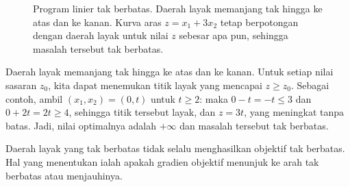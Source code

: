 \begin{solution}
\begin{figure}[H]
\caption{Program linier tak berbatas. Daerah layak memanjang tak hingga ke atas dan ke kanan. Kurva aras $z = x_1 + 3x_2$ tetap berpotongan dengan daerah layak untuk nilai $z$ sebesar apa pun, sehingga masalah tersebut tak berbatas.}
\label{fig:LPUnboundFeasibleRegion1}
\end{figure}

Daerah layak memanjang tak hingga ke atas dan ke kanan. Untuk setiap nilai sasaran $z_0$, kita dapat menemukan titik layak yang mencapai $z \geq z_0$. Sebagai contoh, ambil $(x_1,x_2) = (0,t)$ untuk $t\geq 2$: maka $0-t = -t \leq 3$ dan $0+2t = 2t\geq 4$, sehingga titik tersebut layak, dan $z = 3t$, yang meningkat tanpa batas. Jadi, nilai optimalnya adalah $+\infty$ dan masalah tersebut tak berbatas.
\end{solution}

Daerah layak yang tak berbatas tidak selalu menghasilkan objektif tak berbatas. Hal yang menentukan ialah apakah gradien objektif menunjuk ke arah tak berbatas atau menjauhinya.

